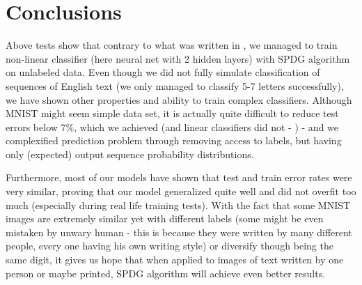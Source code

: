 \documentclass[shortabstract,lic,english]{iithesis}
\begin{document}
\chapter{Conclusions}

Above tests show that contrary to what was written in \cite{liu2017unsupervised}, we managed to train non-linear classifier (here neural net with 2 hidden layers) with SPDG algorithm on unlabeled data. Even though we did not fully simulate classification of sequences of English text (we only managed to classify 5-7 letters successfully), we have shown other properties and ability to train complex classifiers. Although MNIST might seem simple data set, it is actually quite difficult to reduce test errors below $7\%$, which we achieved (and linear classifiers did not - \cite{mnist}) - and we complexified prediction problem through removing access to labels, but having only (expected) output sequence probability distributions.

Furthermore, most of our models have shown that test and train error rates were very similar, proving that our model generalized quite well and did not overfit too much (especially during real life training tests). With the fact that some MNIST images are extremely similar yet with different labels (some might be even mistaken by unwary human - this is because they were written by many different people, every one having his own writing style) or diversify though being the same digit, it gives us hope that when applied to images of text written by one person or maybe printed, SPDG algorithm will achieve even better results.



\end{document}
